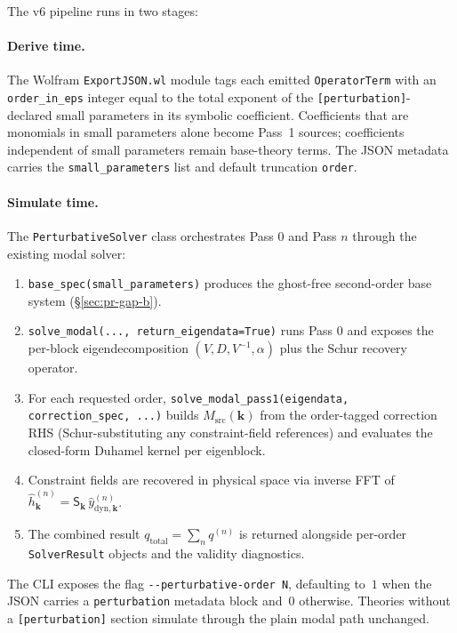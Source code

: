 The v6 pipeline runs in two stages:

\paragraph{Derive time.} The Wolfram \verb|ExportJSON.wl| module tags each emitted \verb|OperatorTerm| with an \verb|order_in_eps| integer equal to the total exponent of the \verb|[perturbation]|-declared small parameters in its symbolic coefficient. Coefficients that are monomials in small parameters alone become Pass~1 sources; coefficients independent of small parameters remain base-theory terms. The JSON metadata carries the \verb|small_parameters| list and default truncation \verb|order|.

\paragraph{Simulate time.} The \verb|PerturbativeSolver| class orchestrates Pass 0 and Pass $n$ through the existing modal solver:
\begin{enumerate}
  \item \verb|base_spec(small_parameters)| produces the ghost-free second-order base system (\S\ref{sec:pr-gap-b}).
  \item \verb|solve_modal(..., return_eigendata=True)| runs Pass 0 and exposes the per-block eigendecomposition $(V, D, V^{-1}, \alpha)$ plus the Schur recovery operator.
  \item For each requested order, \verb|solve_modal_pass1(eigendata, correction_spec, ...)| builds $M_{\mathrm{src}}(\mathbf{k})$ from the order-tagged correction RHS (Schur-substituting any constraint-field references) and evaluates the closed-form Duhamel kernel per eigenblock.
  \item Constraint fields are recovered in physical space via inverse FFT of $\hat{h}^{(n)}_\mathbf{k} = \mathsf{S}_\mathbf{k}\, \hat{y}^{(n)}_{\mathrm{dyn}, \mathbf{k}}$.
  \item The combined result $q_{\mathrm{total}} = \sum_n q^{(n)}$ is returned alongside per-order \verb|SolverResult| objects and the validity diagnostics.
\end{enumerate}

The CLI exposes the flag \verb|--perturbative-order N|, defaulting to~$1$ when the JSON carries a \verb|perturbation| metadata block and~$0$ otherwise. Theories without a \verb|[perturbation]| section simulate through the plain modal path unchanged.

